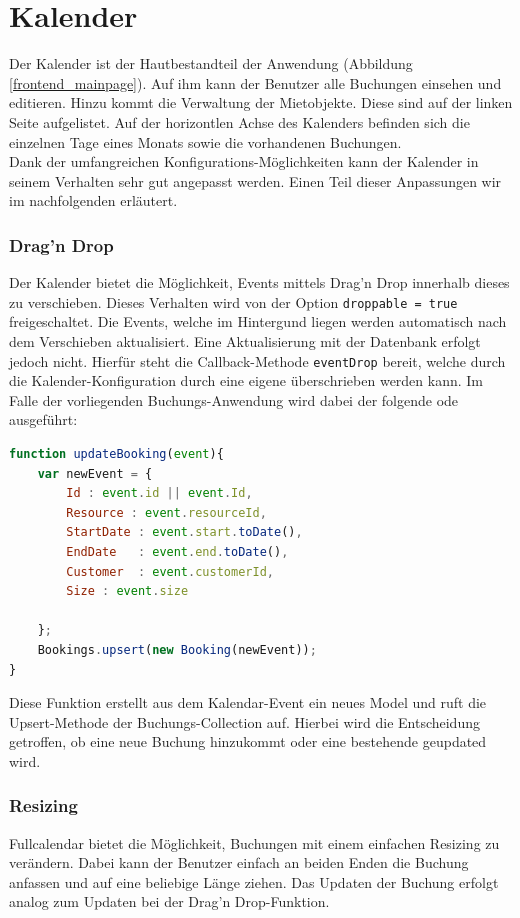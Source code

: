 \section{Kalender}
Der Kalender ist der Hautbestandteil der Anwendung (Abbildung \ref{frontend_mainpage}). Auf ihm kann der Benutzer alle Buchungen einsehen und editieren.
Hinzu kommt die Verwaltung der Mietobjekte.
Diese sind auf der linken Seite aufgelistet. Auf der horizontlen Achse des Kalenders befinden sich die einzelnen Tage eines Monats sowie die vorhandenen Buchungen.\\
Dank der umfangreichen Konfigurations-Möglichkeiten kann der Kalender in seinem Verhalten sehr gut angepasst werden.
Einen Teil dieser Anpassungen wir im nachfolgenden erläutert.

\subsubsection{Drag'n Drop}
Der Kalender bietet die Möglichkeit, Events mittels Drag'n Drop innerhalb dieses zu verschieben. Dieses Verhalten wird von der Option \texttt{droppable = true} freigeschaltet.
Die Events, welche im Hintergund liegen werden automatisch nach dem Verschieben aktualisiert.
Eine Aktualisierung mit der Datenbank erfolgt jedoch nicht. Hierfür steht die Callback-Methode \texttt{eventDrop} bereit, welche durch die Kalender-Konfiguration
durch eine eigene überschrieben werden kann. Im Falle der vorliegenden Buchungs-Anwendung wird dabei der folgende ode ausgeführt:

 \begin{lstlisting}[language=Javascript, label=code_exampleUpdateBooking, caption=Aktualisierungscode nach einem Drag\'nDrop-Event]
function updateBooking(event){
    var newEvent = {
        Id : event.id || event.Id,
        Resource : event.resourceId,
        StartDate : event.start.toDate(),
        EndDate   : event.end.toDate(),
        Customer  : event.customerId,
        Size : event.size

    };
    Bookings.upsert(new Booking(newEvent));
}
 \end{lstlisting}

 Diese Funktion erstellt aus dem Kalendar-Event ein neues Model und ruft die Upsert-Methode der Buchungs-Collection auf.
 Hierbei wird die Entscheidung getroffen, ob eine neue Buchung hinzukommt oder eine bestehende geupdated wird.

 \subsubsection{Resizing}
 Fullcalendar bietet die Möglichkeit, Buchungen mit einem einfachen Resizing zu verändern. Dabei kann der Benutzer einfach an beiden Enden die Buchung anfassen und auf eine beliebige Länge ziehen.
 Das Updaten der Buchung erfolgt analog zum Updaten bei der Drag'n Drop-Funktion.

